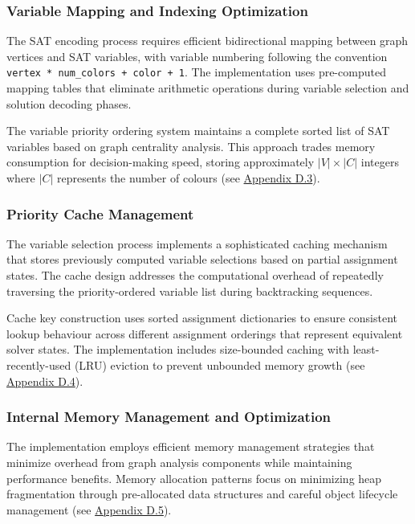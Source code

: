 \subsubsection{Variable Mapping and Indexing Optimization}

The SAT encoding process requires efficient bidirectional mapping between graph vertices and SAT variables, with variable numbering following the convention \texttt{vertex * num\_colors + color + 1}. The implementation uses pre-computed mapping tables that eliminate arithmetic operations during variable selection and solution decoding phases.

The variable priority ordering system maintains a complete sorted list of SAT variables based on graph centrality analysis. This approach trades memory consumption for decision-making speed, storing approximately $|V| \times |C|$ integers where $|C|$ represents the number of colours (see \hyperref[appendix:variable-mapping]{Appendix D.3}).

\subsubsection{Priority Cache Management}

The variable selection process implements a sophisticated caching mechanism that stores previously computed variable selections based on partial assignment states. The cache design addresses the computational overhead of repeatedly traversing the priority-ordered variable list during backtracking sequences.

Cache key construction uses sorted assignment dictionaries to ensure consistent lookup behaviour across different assignment orderings that represent equivalent solver states. The implementation includes size-bounded caching with least-recently-used (LRU) eviction to prevent unbounded memory growth (see \hyperref[appendix:priority-cache]{Appendix D.4}).

\subsubsection{Internal Memory Management and Optimization}

The implementation employs efficient memory management strategies that minimize overhead from graph analysis components while maintaining performance benefits. Memory allocation patterns focus on minimizing heap fragmentation through pre-allocated data structures and careful object lifecycle management (see \hyperref[appendix:memory-optimization]{Appendix D.5}).

